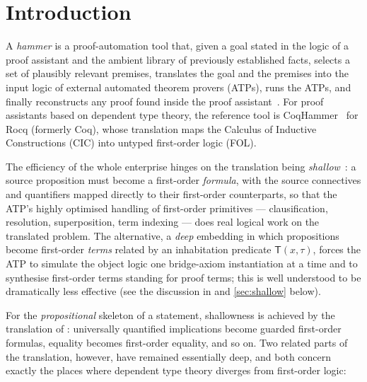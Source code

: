 \section{Introduction}
\label{sec:intro}

A \emph{hammer} is a proof-automation tool that, given a goal stated in the
logic of a proof assistant and the ambient library of previously established
facts, selects a set of plausibly relevant premises, translates the goal and
the premises into the input logic of external automated theorem provers
(ATPs), runs the ATPs, and finally reconstructs any proof found inside the
proof assistant~\cite{BlanchetteEtAl2016qed}.  For proof assistants based on
dependent type theory, the reference tool is
CoqHammer~\cite{CzajkaKaliszyk2018,CoqHammer} for Rocq (formerly Coq), whose
translation maps the Calculus of Inductive Constructions (CIC) into untyped
first-order logic (FOL).

The efficiency of the whole enterprise hinges on the translation being
\emph{shallow}~\cite{Czajka2018}: a source proposition must become a
first-order \emph{formula}, with the source connectives and quantifiers
mapped directly to their first-order counterparts, so that the ATP's highly
optimised handling of first-order primitives --- clausification,
resolution, superposition, term indexing --- does real logical work on the
translated problem.  The alternative, a \emph{deep} embedding in which
propositions become first-order \emph{terms} related by an inhabitation
predicate $\mathsf{T}(x,\tau)$, forces the ATP to simulate the object logic
one bridge-axiom instantiation at a time and to synthesise first-order terms
standing for proof terms; this is well understood to be dramatically less
effective (see the discussion in \cite[\S 1.1]{Czajka2018} and
\cref{sec:shallow} below).

For the \emph{propositional} skeleton of a statement, shallowness is
achieved by the translation of \cite{CzajkaKaliszyk2018}: universally
quantified implications become guarded first-order formulas, equality
becomes first-order equality, and so on.  Two related parts of the
translation, however, have remained essentially deep, and both concern
exactly the places where dependent type theory diverges from first-order
logic:

